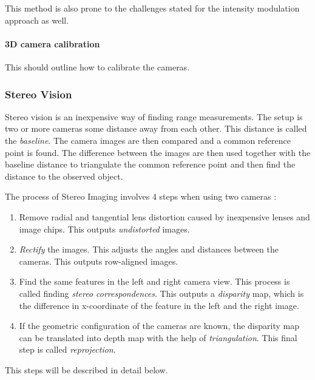 This method is also prone to the challenges stated for the intensity modulation approach
as well.

\paragraph{3D camera calibration}
This should outline how to calibrate the cameras. 



\subsubsection{Stereo Vision}
Stereo vision is an inexpensive way of finding range measurements. The setup is two or
more cameras some distance away from each other. This distance is called the
\emph{baseline}. The camera images are then compared and a common reference point is
found. The difference between the images are then used together with the baseline distance
to triangulate the common reference point and then find the distance to the observed
object. 

The process of Stereo Imaging involves 4 steps when using two cameras \cite{openCV}:
\begin{enumerate}
    \item Remove radial and tangential lens distortion caused by inexpensive lenses and
        image chips. This outputs \emph{undistorted} images. 
    \item \emph{Rectify} the images. This adjusts the angles and distances between the cameras.
        This outputs row-aligned images.
    \item Find the same features in the left and right camera view. This process is called
        finding \emph{stereo correspondences}. This outputs a \emph{disparity} map, which
        is the difference in x-coordinate of the feature in the left and the right image. 
    \item If the geometric configuration of the cameras are known, the disparity map can
        be translated into depth map with the help of \emph{triangulation}. This final
        step is called \emph{reprojection}.
\end{enumerate}
This steps will be described in detail below. 


